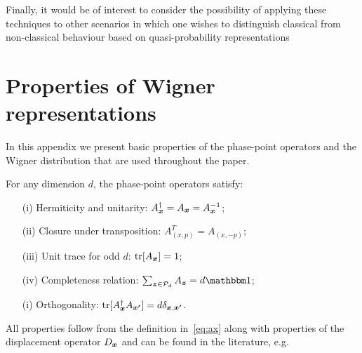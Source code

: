 \documentclass[pra,
aps,
twocolumn,
superscriptaddress,
groupedaddress,
nofootinbib,
reprint
]{revtex4-1}
\begin{document}
Finally, it would be of interest to consider the possibility of applying these techniques to other scenarios in which one wishes to distinguish classical from non-classical behaviour based on quasi-probability representations~\cite{Ferrie_2008, barnett_1997}



%


\appendix
\newpage
\section{Properties of Wigner representations}
\label{app:wigner}

In this appendix we present basic properties of the phase-point operators and the Wigner distribution that are used throughout the paper.

\begin{proposition}\label{thm:aproperties}
    For any dimension $d$, the phase-point operators satisfy:
    \begin{enumerate}
        \item[(i)]\label{en:a1} Hermiticity and unitarity: $A_{\bm{x}}^\dagger = A_{\bm{x}} = A_{\bm{x}}^{-1}$;
	    \item[(ii)]\label{en:a2} Closure under transposition: $A_{(x, p)}^T = A_{(x, -p)}$;
	    \item[(iii)]\label{en:a3} Unit trace for odd $d$: $\mbox{tr}[A_{\bm{x}}] = 1$;
	    \item[(iv)]\label{en:a4} Completeness relation: $\sum_{\bmz \in \cal{P}_d} A_{\bmz} = d\id$;
	    \item[(i)]\label{en:a5} Orthogonality: $\mbox{tr}[A_{\bm{x}}^\dagger A_{\bm{x'}}] = d \delta_{\bm{x},\bm{x'}}$.
	\end{enumerate}
\end{proposition}
All properties follow from the definition in~\cref{eq:ax} along with properties of the displacement operator $D_{\bm{x}}$ and can be found in the literature, e.g.~\cite{cit:veitch,Vourdas_2004,cit:gross3}
\end{document}
